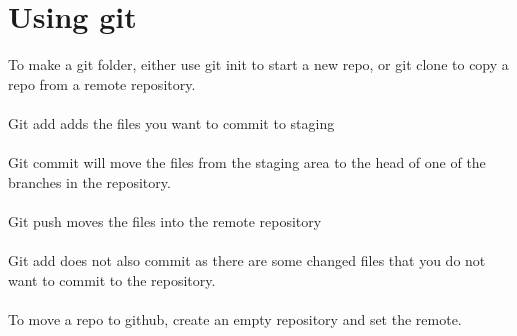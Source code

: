 \documentclass{article}[18pt]
\begin{document}
\section{Using git}
To make a git folder, either use git init to start a new repo, or git clone to copy a repo from a remote repository.\\
\\
Git add adds the files you want to commit to staging\\
\\
Git commit will move the files from the staging area to the head of one of the branches in the repository.\\
\\
Git push moves the files into the remote repository\\
\\
Git add does not also commit as there are some changed files that you do not want to commit to the repository.\\
\\
To move a repo to github, create an empty repository and set the remote.
\end{document}
